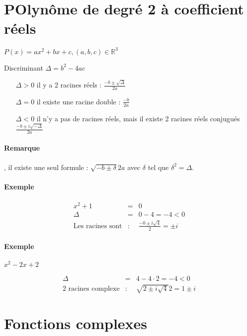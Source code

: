 \section{POlynôme de degré 2 à  coefficient réels}

$P(x) = ax^2 + bx + c, (a, b, c) \in \mathbb{R}^3$

Discriminant $\Delta = b^2 - 4ac$

\begin{itemize}
	\item[$\Delta > 0$] il y a 2 racines réels : $\frac{-b \pm \sqrt{\Delta}}{2a}$
	\item[$\Delta = 0$] il existe une racine double : $\frac{-b}{2a}$
	\item[$\Delta < 0$] il n'y a pas de racines réels, mais il existe 2 racines réels conjugués $\frac{-b \pm i\sqrt{-\Delta}}{2a}$
\end{itemize}

\paragraph{Remarque}, il existe une seul formule : $\sqrt{-b \pm \delta}{2a}$ avec $\delta$ tel que $\delta^2 = \Delta$.

\paragraph{Exemple}

\[\begin{array}{rcl}
	x^2 + 1 &=& 0 \\
	\Delta &=& 0 - 4 = -4 < 0\\
	\text{Les racines sont} &:& \frac{-0 \pm i\sqrt{4}}{2} = \pm i\end{array}\]

\paragraph{Exemple} $x^2 -2x + 2$

\[\begin{array}{rcl}
	\Delta &=& 4 - 4\cdot 2 = -4 < 0 \\
	\text{2 racines complexe} &:& \sqrt{2 \pm i\sqrt{4}}{2} = 1 \pm i\end{array}\]

\section{Fonctions complexes}

